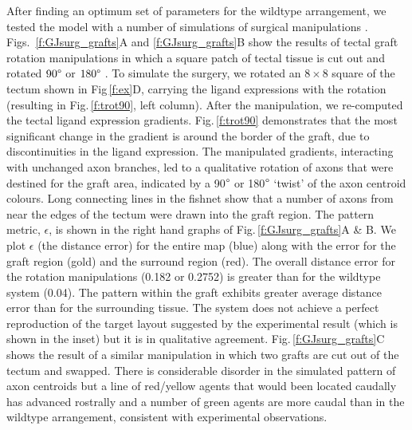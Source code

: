 \documentclass[9pt]{elife} %
\begin{document}
After finding an optimum set of parameters for the wildtype arrangement, we
tested the model with a number of simulations of surgical manipulations
.
Figs.~\ref{f:GJsurg_grafts}A and \ref{f:GJsurg_grafts}B show the results of tectal graft rotation manipulations in which a square patch of tectal tissue is cut out and rotated $90\degree$ or $180\degree$ \citep{chung_observations_1978}.
%
To simulate the surgery, we rotated an $8\times8$ square of the tectum shown in Fig\,\ref{f:ex}D, carrying the ligand expressions with the rotation (resulting in Fig.\,\ref{f:trot90}, left column).
After the manipulation, we re-computed the tectal ligand expression gradients. Fig.\,\ref{f:trot90} demonstrates that the most significant change in the gradient is around the border of the graft, due to discontinuities in the ligand expression.
The manipulated gradients, interacting with unchanged axon branches, led to a qualitative rotation of axons that were destined for the graft area, indicated by a 90$\degree$ or 180$\degree$ `twist' of the axon centroid colours.
Long connecting lines in the fishnet show that a number of axons from near the edges of the tectum were drawn into the graft region.
The pattern metric, $\epsilon$, is shown in the right hand graphs of Fig.\,\ref{f:GJsurg_grafts}A \& B.
We plot $\epsilon$ (the distance error) for the entire map (blue) along with the error for the graft region (gold) and the surround region (red).
The overall distance error for the rotation manipulations (0.182 or 0.2752)  is greater than for the wildtype system (0.04).
The pattern within the graft exhibits greater average distance error than for the surrounding tissue.
The system does not achieve a perfect reproduction of the target layout suggested by the experimental result (which is shown in the inset) but it is in qualitative agreement.
%
Fig.\,\ref{f:GJsurg_grafts}C shows the result of a similar manipulation in which two grafts are cut out of the tectum and swapped.
There is considerable disorder in the simulated pattern of axon centroids but a line of red/yellow agents that would been located caudally has advanced rostrally and a number of green agents are more caudal than in the wildtype arrangement, consistent with experimental observations.
\end{document}

